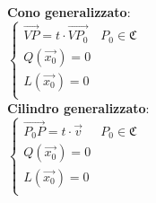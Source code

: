 \begin{multicols}{2}
	\textbf{Cono generalizzato}: \\
	$\begin{cases}
		\overrightarrow{VP}=t\cdot\overrightarrow{VP_{0}}& P_{0}\in \mathfrak{C} \\
		Q(\vec{x_{0}})=0 \\
		L(\vec{x_{0}})=0 \\
	\end{cases}$ \\

	\textbf{Cilindro generalizzato}: \\
	$\begin{cases}
		\overrightarrow{P_{0}P}=t\cdot\vec{v}& P_{0}\in \mathfrak{C} \\
		Q(\vec{x_{0}})=0 \\
		L(\vec{x_{0}})=0 \\
	\end{cases}$ \\
\end{multicols}
